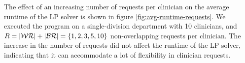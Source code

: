 



The effect of an increasing number of requests per clinician on the average runtime of the LP solver is shown in figure \ref{fig:avg-runtime-requests}. We executed the program on a single-division department with 10 clinicians, and $R = \abs{\mathcal{WR}} + \abs{\mathcal{BR}} = \{1, 2, 3, 5, 10\}$ non-overlapping requests per clinician. The increase in the number of requests did not affect the runtime of the LP solver, indicating that it can accommodate a lot of flexibility in clinician requests. \\

